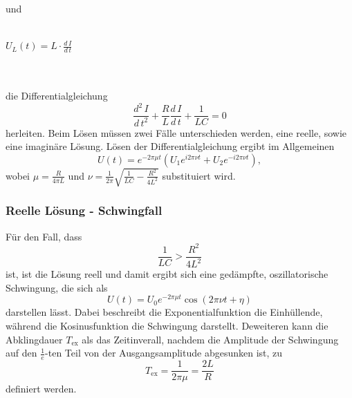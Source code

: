         und
        \\ \\
        \centerline{$U_L(t) = L \cdot \frac {d \, I} {d \, t} $}
        \\ \\
        die Differentialgleichung 
        \begin{equation}
            \label{eqn:diffgleichung}
            \frac{d^2 \, I}{d \, t^2} + \frac{R}{L} \frac{d \, I}{d \, t} + \frac {1}{L C} = 0
        \end{equation}
        herleiten. Beim Lösen müssen zwei Fälle unterschieden werden, eine reelle, sowie eine imaginäre Lösung. 
        Lösen der Differentialgleichung ergibt im Allgemeinen
        \begin{equation} 
            \label{eqn:strom_allgemein}
            U(t) = e^{-2 \pi \mu t} (U_1 e^{i 2 \pi \nu t} + U_2 e^{-i 2 \pi \nu t}) ,
        \end{equation}
        wobei $\mu = \frac{R}{4 \pi L} $ und $\nu = \frac{1}{2 \pi} \sqrt{\frac{1}{L C} - \frac{R^2}{4 L^2} }$
        substituiert wird.
        \subsubsection{Reelle Lösung - Schwingfall}
            Für den Fall, dass
            \begin{equation}
                \label{eqn:bedingung_reell}
                \frac{1}{L C} > \frac{R^2}{4 L^2}
            \end{equation}
            ist, ist die Lösung reell und damit ergibt sich eine gedämpfte, oszillatorische Schwingung, die sich als
            \begin{equation}
                \label{eqn:reell_lösung}
                U(t) = U_0 e^{-2 \pi \mu t} \cos(2 \pi \nu t + \eta) 
            \end{equation}
            darstellen lässt. Dabei beschreibt die Exponentialfunktion die Einhüllende, während die Kosinusfunktion die Schwingung darstellt.
            Deweiteren kann die Abklingdauer $T_\text{ex}$ als das Zeitinverall, nachdem die Amplitude der Schwingung auf den $\frac{1}{e}$-ten Teil
            von der Ausgangsamplitude abgesunken ist, zu
            \begin{equation}
                \label{eqn:abklingdauer}
                T_\text{ex} = \frac{1}{2 \pi \mu} = \frac{2 L}{R}
            \end{equation}
            definiert werden.

